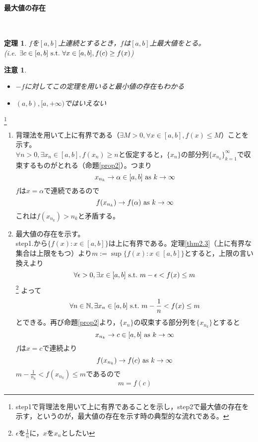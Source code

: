 \documentclass[dvipdfmx,a4j,10pt]{jsarticle}
\makeatletter
\theoremstyle{mystyle1}
\newtheorem{thm}[dfn]{定理}
\theoremstyle{mystyle2}
\newtheorem{note}{注意}
\renewenvironment{proof}[1][\proofname]{\par
  \pushQED{\qed}%
  \normalfont
  \topsep6\p@\@plus6\p@ \trivlist
  \item[\hskip\labelsep{\bfseries\sffamily #1}]\ignorespaces
}{%
  \popQED\endtrivlist\@endpefalse
}
\renewcommand\proofname{証明}
\makeatother
\begin{document}
\newpage

\paragraph{最大値の存在}
　
\begin{framed}
\begin{thm}\label{thm5.7}
$f$を$[a,b]$上連続とするとき，$f$は$[a,b]$上最大値をとる。\\
(i.e. $\exists c\in [a,b] \ {\rm s.t.}\ \forall x\in [a,b],f(c)\geq f(x)$)
\end{thm}
\end{framed}
\begin{note}　
\begin{itemize}
\item $-f$に対してこの定理を用いると最小値の存在もわかる
\item $(a,b),[a,+\infty)$ではいえない
\end{itemize}
\end{note}

\begin{proof}[定理\ref{thm5.7}の証明]\footnote{step1で背理法を用いて上に有界であることを示し，step2で最大値の存在を示す，というのが，最大値の存在を示す時の典型的な流れである。}
    \begin{enumerate}
        \renewcommand{\labelenumi}{Step\arabic{enumi}.}
        \item 背理法を用いて上に有界である（$\exists M>0,\forall x\in [a,b],f(x)\leq M$）ことを示す。\\
        $\forall n>0,\exists x_n\in [a,b], f(x_n)\geq n$と仮定すると，$\{x_n\}$の部分列$\{x_{n_k}\}_{k=1}^\infty$で収束するものがとれる（命題\ref{prop2}）。つまり
        \[
        x_{n_k}\to\alpha\in [a,b] \ {\rm as}\ k\to\infty
        \]
        $f$は$x=\alpha$で連続であるので
        \[
        f(x_{n_k})\to f(\alpha) \ {\rm as} \ k\to\infty
        \]
        これは$f(x_{n_k})>n_k$と矛盾する。
        \item 最大値の存在を示す。\\
        step1.から$\{f(x):x\in [a,b]\}$は上に有界である。定理\ref{thm2.3}（上に有界な集合は上限をもつ）より$m:=\sup\{f(x):x\in [a,b]\}$とすると，上限の言い換えより
        \[
        \forall\epsilon>0,\exists x\in [a,b]\  {\rm s.t.}\ m-\epsilon<f(x)\leq m
        \]\footnote{$\epsilon$を$\frac{1}{n}$に，$x$を$x_n$としたい}
        よって
        \[
        \forall n\in\mathbb{N},\exists x_n\in [a,b] \ {\rm s.t.} \ m-\frac{1}{n}<f(x)\leq m
        \]
        とできる。再び命題\ref{prop2}より，$\{x_n\}$の収束する部分列を$\{x_{n_k}\}$とすると
        \[
        x_{n_k}\to c\in [a,b] \ {\rm as} \ k\to\infty
        \]
        $f$は$x=c$で連続より
        \[
        f(x_{n_k})\to f(c) \ {\rm as} \ k\to\infty
        \]
        $\displaystyle m-\frac{1}{n_k}<f(x_{n_k})\leq m$であるので
        \[
        m=f(c)
        \]
    \end{enumerate}
\end{proof}
\end{document}
